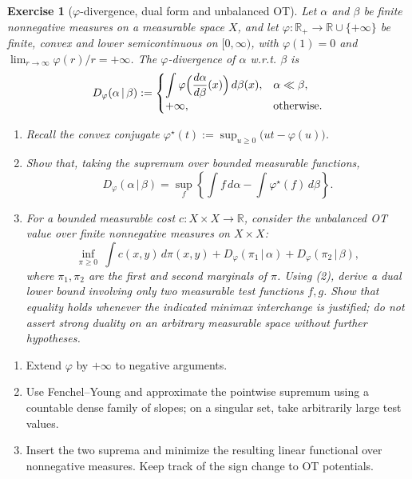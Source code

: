 \documentclass[11pt,a4paper]{article}
\theoremstyle{exostyle}
\newtheorem{exercise}{Exercise}
\begin{document}
\begin{exercise}[$\varphi$-divergence, dual form and unbalanced OT]\label{ex:phi-div}
Let $\alpha$ and $\beta$ be finite nonnegative measures on a measurable space $X$, and let $\varphi:\mathbb R_+\to\mathbb R\cup\{+\infty\}$ be finite, convex and lower semicontinuous on $[0,\infty)$, with $\varphi(1)=0$ and $\lim_{r\to\infty}\varphi(r)/r=+\infty$. The $\varphi$-divergence of $\alpha$ w.r.t. $\beta$ is
\[
D_\varphi(\alpha\,|\,\beta) :=
\begin{cases}
\displaystyle \int \varphi\Bigl( \frac{d\alpha}{d\beta}(x) \Bigr)\,d\beta(x), & \alpha \ll \beta,\\[0.4em]
+\infty, & \text{otherwise.}
\end{cases}
\]
\begin{enumerate}[label=\textbf{(\arabic*)}]
  \item Recall the convex conjugate $\varphi^\star(t) := \sup_{u\ge0} \bigl(u t - \varphi(u)\bigr)$.
  \item Show that, taking the supremum over bounded measurable functions,
  \[
  D_\varphi(\alpha\,|\,\beta)
  = \sup_{f} \left\{ \int f\,d\alpha - \int \varphi^\star(f)\,d\beta \right\}.
  \]
  \item For a bounded measurable cost $c:X\times X\to\mathbb R$, consider
  the unbalanced OT value over finite nonnegative measures on $X\times X$:
  \[
  \inf_{\pi\ge0} \ \int c(x,y)\,d\pi(x,y)
  + D_\varphi(\pi_1\,|\,\alpha)
  + D_\varphi(\pi_2\,|\,\beta),
  \]
  where $\pi_1,\pi_2$ are the first and second marginals of $\pi$. Using (2), derive a dual lower bound involving only two measurable test functions $f,g$. Show that equality holds whenever the indicated minimax interchange is justified; do not assert strong duality on an arbitrary measurable space without further hypotheses.
\end{enumerate}
\end{exercise}
\begin{hints}
\begin{enumerate}[label=(\arabic*)]\item Extend $\varphi$ by $+\infty$ to negative arguments.\item Use Fenchel--Young and approximate the pointwise supremum using a countable dense family of slopes; on a singular set, take arbitrarily large test values.\item Insert the two suprema and minimize the resulting linear functional over nonnegative measures. Keep track of the sign change to OT potentials.\end{enumerate}
\end{hints}
\end{document}
